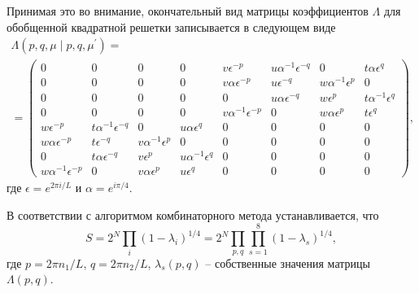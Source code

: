 \documentclass[utf8,12pt]{jetp}
\begin{document}
Принимая это во внимание, окончательный вид матрицы коэффициентов $\Lambda$ для обобщенной квадратной решетки записывается в следующем виде
\begin{multline}
\Lambda (p, q, \mu\; |\; p, q, \mu^{'}) = \\ =
\begin{pmatrix}
0 \!\!\!& 0 \!\!\!& 0 \!\!\!& 0\!\!\! & v \epsilon^{-p} \!\!\!& u \alpha^{-1} \epsilon^{-q} \!\!\!& 0 \!\!\!& t \alpha \epsilon^{q} \!\!\! \\
0 \!\!\!& 0 \!\!\!& 0 \!\!\!& 0 \!\!\!& v \alpha \epsilon^{-p}\!\!\! & u \epsilon^{-q}\!\!\! & w \alpha^{-1} \epsilon^{p}\!\!\! & 0\!\!\! \\
0 \!\!\!& 0 \!\!\!& 0 \!\!\!& 0\!\!\! & 0\!\!\! & u \alpha \epsilon^{-q} \!\!\!& w \epsilon^{p} \!\!\!& t \alpha^{-1} \epsilon^{q}\!\!\!  \\
0 \!\!\!& 0 \!\!\!& 0 \!\!\!& 0\!\!\! & v \alpha^{-1} \epsilon^{-p}\!\!\! & 0 \!\!\!& w \alpha \epsilon^{p} \!\!\!& t \epsilon^{q}\!\!\!  \\
w \epsilon^{-p} \!\!\!& t \alpha^{-1} \epsilon^{-q} \!\!\!& 0\!\!\! & u \alpha \epsilon^{q}\!\!\! & 0\!\!\! & 0\!\!\! & 0\!\!\! & 0\!\!\!  \\
w \alpha \epsilon^{-p}\!\!\! & t \epsilon^{-q} \!\!\!& v \alpha^{-1} \epsilon^{p}\!\!\! & 0 \!\!\!& 0\!\!\! & 0\!\!\! & 0\!\!\! & 0\!\!\! \\
0 \!\!\!& t \alpha \epsilon^{-q}\!\!\! & v \epsilon^{p} \!\!\!& u \alpha^{-1} \epsilon^{q}\!\!\! & 0 \!\!\!& 0\!\!\! & 0\!\!\! & 0 \!\!\! \\
w \alpha^{-1} \epsilon^{-p}\!\!\! & 0\!\!\! & v \alpha \epsilon^{p}\!\!\! & u \epsilon^{q} \!\!\!& 0\!\!\! & 0\!\!\! & 0 \!\!\!& 0 \!\!\!
\end{pmatrix},
\end{multline}
где $\epsilon = e^{2\pi i/L}$ и $\alpha = e^{i\pi/4}$.

В соответствии с алгоритмом комбинаторного метода \cite{vdovichenko1965,vaks1965} устанавливается, что
\begin{equation}
	S = 2^N \prod_{i} (1-\lambda_i)^{1/4} = 2^N	\prod_{p, q} \prod_{s=1}^{8} (1-\lambda_s)^{1/4},
	\label{Sformula}
\end{equation}
где $p=2\pi n_1/L$, $q=2\pi n_2/L$, $\lambda_s(p, q)$ -- собственные значения матрицы $\Lambda(p, q)$.
\end{document}
